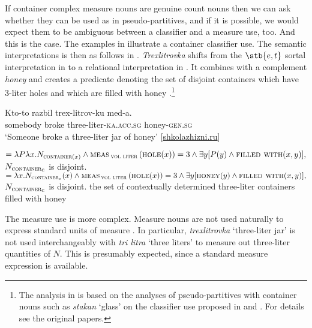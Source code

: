 \documentclass[output=paper,
colorlinks,
citecolor=brown,
newtxmath
]{langscibook}
\begin{document}
\noindent If container complex measure nouns are genuine count nouns then we can ask whether they can be used as in pseudo-partitives, and if it is possible, we would expect them to be ambiguous between a classifier and a measure use, too. And this is the case. The examples in  illustrate a container classifier use. The semantic interpretations is then as follows in . \textit{Trexlitrovka} shifts from the $\stb{e,t}$ sortal interpretation in  to a relational interpretation in . It combines with a complement \textit{honey} and creates a predicate denoting the set of disjoint containers which have 3-liter holes and which are filled with honey .\footnote{The analysis in  is based on the analyses of  pseudo-partitives with container nouns such as \textit{stakan} `glass' on the classifier use proposed in \citet{Partee.Borschev2012} and \citet{Khrizman2016,Khrizman2016b}. For details see the original papers.}

\ea\label{ex:khrizmann:29}
    \ea\label{ex:khrizmann:29a} \gll Kto-to razbil trex-litrov-ku med-a.\\
    somebody broke three-liter-\textsc{ka.acc.sg} honey-\textsc{gen.sg}\\
    \glt `Someone broke a three-liter jar of honey' \hfill [\href{http://shkolazhizni.ru/psychology/articles/57018/}{shkolazhizni.ru}]
\z\z

\ea\label{ex:khrizmann:30}
    \ea\label{ex:khrizmann:30a}  $= \lambda P \lambda x.N_{\textsc{container}(x)} \wedge \textsc{meas}\,_{\textsc{vol liter}}\,(\textsc{hole}(x)) = 3 \wedge \exists y [P(y) \wedge \textsc{filled with}(x,y)],$
    {\small $N_{\textsc{container}\textsubscript{c}}$ is disjoint.}
    \ex\label{ex:khrizmann:30b}  $= \lambda x.N_{\textsc{container}_{c}}(x) \wedge \textsc{meas}\,_{\textsc{vol liter}}\,(\textsc{hole}(x)) = 3 \wedge \exists y [\textsc{honey}(y) \wedge \textsc{filled with}(x,y)],$
    {\small $N_{\textsc{container}\textsubscript{c}}$ is disjoint.}
    \z
{\small the set of contextually determined three-liter containers filled with honey}
\z

\noindent The measure use is more complex. Measure nouns are not used naturally to express standard units of measure . In particular, \textit{trexlitrovka} `three-liter jar' is not used interchangeably with \textit{tri litra} `three liters' to measure out three-liter quantities of $N$. This is presumably expected, since a standard measure expression is available.
\end{document}
